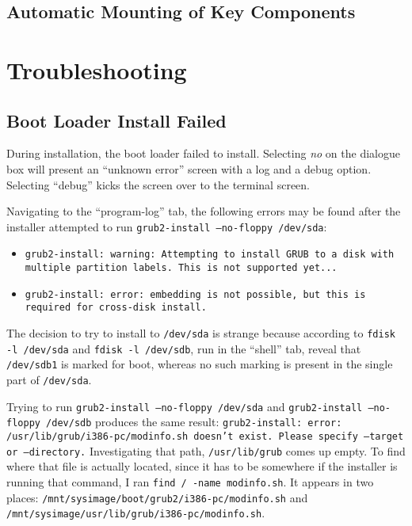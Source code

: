 \documentclass[12pt]{article}
\begin{document}
\subsection{Automatic Mounting of Key Components}





\section{Troubleshooting}

\subsection{Boot Loader Install Failed}

\qq During installation, the boot loader failed to install. Selecting
\textit{no} on the dialogue box will present an ``unknown error'' screen with a
log and a debug option. Selecting ``debug'' kicks the screen over to the
terminal screen.

\qq Navigating to the ``program-log'' tab, the following errors may be found
after the installer attempted to run {\tt grub2-install --no-floppy /dev/sda}:

\begin{itemize}
\item {\tt grub2-install: warning: Attempting to install GRUB to a disk with multiple
    partition labels. This is not supported yet...}
\item {\tt grub2-install: error: embedding is not possible, but this is required
    for cross-disk install.}
\end{itemize}

The decision to try to install to {\tt /dev/sda} is strange because according to
{\tt fdisk -l /dev/sda} and {\tt fdisk -l /dev/sdb}, run in the ``shell'' tab,
reveal that {\tt /dev/sdb1} is marked for boot, whereas no such marking is
present in the single part of {\tt /dev/sda}.

\qq Trying to run {\tt grub2-install --no-floppy /dev/sda} and {\tt grub2-install
  --no-floppy /dev/sdb} produces the same result: {\tt grub2-install: error:
  /usr/lib/grub/i386-pc/modinfo.sh doesn't exist. Please specify --target or
  --directory.} Investigating that path, {\tt /usr/lib/grub} comes up empty. To
find where that file is actually located, since it has to be somewhere if the
installer is running that command, I ran {\tt find / -name modinfo.sh}. It
appears in two places: {\tt /mnt/sysimage/boot/grub2/i386-pc/modinfo.sh} and
{\tt /mnt/sysimage/usr/lib/grub/i386-pc/modinfo.sh}.
\end{document}
